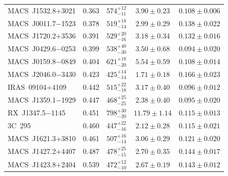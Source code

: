 \begin{table}
\begin{tabular}{lclcc}
    MACS~J1532.8+3021    &  0.363  &  $574^{+12}_{-11}$  &                $3.90\pm0.23$   &  $0.108\pm0.006$\vspace{0.5ex}\\
    MACS~J0011.7$-$1523  &  0.378  &  $519^{+18}_{-14}$  &                $2.99\pm0.29$   &  $0.138\pm0.022$\vspace{0.5ex}\\
    MACS~J1720.2+3536    &  0.391  &  $529^{+20}_{-16}$  &                $3.18\pm0.34$   &  $0.132\pm0.016$\vspace{0.5ex}\\
    MACS~J0429.6$-$0253  &  0.399  &  $538^{+40}_{-30}$  &                $3.50\pm0.68$   &  $0.094\pm0.020$\vspace{0.5ex}\\
    MACS~J0159.8$-$0849  &  0.404  &  $621^{+18}_{-20}$  &                $5.54\pm0.59$   &  $0.108\pm0.014$\vspace{0.5ex}\\
    MACS~J2046.0$-$3430  &  0.423  &  $425^{+14}_{-14}$  &                $1.71\pm0.18$   &  $0.166\pm0.023$\vspace{0.5ex}\\
    IRAS~09104+4109      &  0.442  &  $515^{+22}_{-18}$  &                $3.17\pm0.40$   &  $0.096\pm0.012$\vspace{0.5ex}\\
    MACS~J1359.1$-$1929  &  0.447  &  $468^{+25}_{-25}$  &                $2.38\pm0.40$   &  $0.095\pm0.020$\vspace{0.5ex}\\
    RX~J1347.5$-$1145    &  0.451  &  $798^{+30}_{-20}$  &  \hspace{-1ex}$11.79\pm1.14$   &  $0.115\pm0.013$\vspace{0.5ex}\\
    3C~295               &  0.460  &  $447^{+22}_{-16}$  &                $2.12\pm0.28$   &  $0.115\pm0.021$\vspace{0.5ex}\\
    MACS~J1621.3+3810    &  0.461  &  $507^{+16}_{-14}$  &                $3.06\pm0.29$   &  $0.121\pm0.020$\vspace{0.5ex}\\
    MACS~J1427.2+4407    &  0.487  &  $478^{+25}_{-15}$  &                $2.70\pm0.35$   &  $0.144\pm0.017$\vspace{0.5ex}\\
    MACS~J1423.8+2404    &  0.539  &  $472^{+12}_{-10}$  &                $2.67\pm0.19$   &  $0.143\pm0.012$\vspace{0.5ex}\\

\end{tabular}
\end{table}
